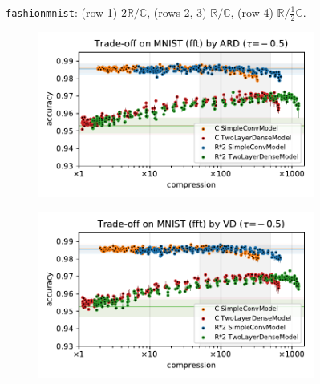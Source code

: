 \documentclass[a4paper,10pt,onecolumn]{article}
\newcommand{\real}{\mathbb{R}}
\newcommand{\cplx}{\mathbb{C}}
\begin{document}
\begin{figure}[b]
\begin{subfigure}[b]{0.5\columnwidth}
  \end{subfigure}
  \caption{%
    \texttt{fashionmnist}: (row 1) $2\real / \cplx$, (rows 2, 3) $\real / \cplx$, (row 4) $\real / \tfrac12\cplx$.
  }
\end{figure}

\begin{figure}[b]
  \centering
  \begin{subfigure}[b]{0.5\columnwidth}
    \centering
    \includegraphics[width=\columnwidth]{figure__mnist-like__trade-off/appendix__cmp__ARD__mnist__fft__-0.5.pdf}
  \end{subfigure}%
  \begin{subfigure}[b]{0.5\columnwidth}
    \centering
    \includegraphics[width=\columnwidth]{figure__mnist-like__trade-off/appendix__cmp__VD__mnist__fft__-0.5.pdf}
  \end{subfigure} \\%
  \begin{subfigure}[b]{0.5\columnwidth}

\end{subfigure}
\end{figure}
\end{document}
